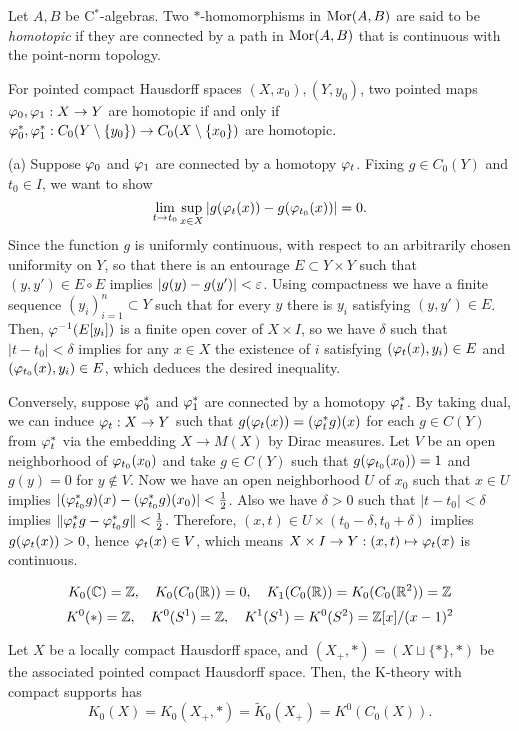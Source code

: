 \documentclass{../../large}
\begin{document}
\begin{prb}
Let $A,B$ be C$^*$-algebras.
Two $*$-homomorphisms in $\operatorname{Mor}(A,B)$ are said to be \emph{homotopic} if they are connected by a path in $\operatorname{Mor}(A,B)$ that is continuous with the point-norm topology.
\begin{parts}
\item For pointed compact Hausdorff spaces $(X,x_0),(Y,y_0)$, two pointed maps $\varphi_0,\varphi_1:X\to Y$ are homotopic if and only if $\varphi_0^*,\varphi_1^*:C_0(Y\setminus\{y_0\})\to C_0(X\setminus\{x_0\})$ are homotopic.
\end{parts}
\end{prb}
\begin{pf}
(a)
Suppose $\varphi_0$ and $\varphi_1$ are connected by a homotopy $\varphi_t$.
Fixing $g\in C_0(Y)$ and $t_0\in I$, we want to show
\[\lim_{t\to t_0}\sup_{x\in X}|g(\varphi_t(x))-g(\varphi_{t_0}(x))|=0.\]
Since the function $g$ is uniformly continuous, with respect to an arbitrarily chosen uniformity on $Y$, so that there is an entourage $E\subset Y\times Y$ such that $(y,y')\in E\circ E$ implies $|g(y)-g(y')|<\varepsilon$.
Using compactness we have a finite sequence $(y_i)_{i=1}^n\subset Y$ such that for every $y$ there is $y_i$ satisfying $(y,y')\in E$.
Then, $\varphi^{-1}(E[y_i])$ is a finite open cover of $X\times I$, so we have $\delta$ such that $|t-t_0|<\delta$ implies for any $x\in X$ the existence of $i$ satisfying $(\varphi_t(x),y_i)\in E$ and $(\varphi_{t_0}(x),y_i)\in E$, which deduces the desired inequality.

Conversely, suppose $\varphi_0^*$ and $\varphi_1^*$ are connected by a homotopy $\varphi_t^*$.
By taking dual, we can induce $\varphi_t:X\to Y$ such that $g(\varphi_t(x))=(\varphi_t^*g)(x)$ for each $g\in C(Y)$ from $\varphi_t^*$ via the embedding $X\to M(X)$ by Dirac measures.
Let $V$ be an open neighborhood of $\varphi_{t_0}(x_0)$ and take $g\in C(Y)$ such that $g(\varphi_{t_0}(x_0))=1$ and $g(y)=0$ for $y\notin V$.
Now we have an open neighborhood $U$ of $x_0$ such that $x\in U$ implies $|(\varphi_{t_0}^*g)(x)-(\varphi_{t_0}^*g)(x_0)|<\frac12$.
Also we have $\delta>0$ such that $|t-t_0|<\delta$ implies $\|\varphi_t^*g-\varphi_{t_0}^*g\|<\frac12$.
Therefore, $(x,t)\in U\times(t_0-\delta,t_0+\delta)$ implies $g(\varphi_t(x))>0$, hence $\varphi_t(x)\in V$, which means $X\times I\to Y:(x,t)\mapsto\varphi_t(x)$ is continuous.
\end{pf}


\[K_0(\mathbb{C})=\mathbb{Z},\quad K_0(C_0(\mathbb{R}))=0,\quad K_1(C_0(\mathbb{R}))=K_0(C_0(\mathbb{R}^2))=\mathbb{Z}\]
\[K^0(*)=\mathbb{Z},\quad K^0(S^1)=\mathbb{Z},\quad K^1(S^1)=K^0(S^2)=\mathbb{Z}[x]/(x-1)^2\]


Let $X$ be a locally compact Hausdorff space, and $(X_+,*)=(X\sqcup\{*\},*)$ be the associated pointed compact Hausdorff space.
Then, the K-theory with compact supports has
\[K_0(X)=K_0(X_+,*)=\tilde K_0(X_+)=K^0(C_0(X)).\]
\end{document}
